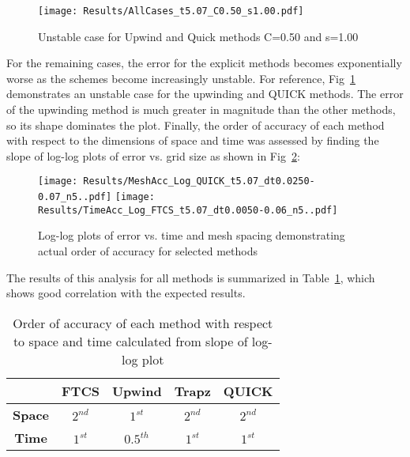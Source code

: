 \documentclass[twocolumn,10pt]{asme2ej}
\begin{document}
\begin{figure}[h]
\begin{center}
\texttt{[image: Results/AllCases\_t5.07\_C0.50\_s1.00.pdf]}
\caption{Unstable case for Upwind and Quick methods C=0.50 and s=1.00}
\label{Unstable}
\end{center}
\end{figure}

\noindent For the remaining cases, the error for the explicit methods becomes exponentially worse as the schemes become increasingly unstable.  For reference, Fig~\ref{Unstable} demonstrates an unstable case for the upwinding and QUICK methods.  The error of the upwinding method is much greater in magnitude than the other methods, so its shape dominates the plot.
Finally, the order of accuracy of each method with respect to the dimensions of space and time was assessed by finding the slope of log-log plots of error vs. grid size as shown in Fig~\ref{OrderAccuracy}:

\begin{figure}[htb]
\begin{center}
\texttt{[image: Results/MeshAcc\_Log\_QUICK\_t5.07\_dt0.0250-0.07\_n5..pdf]}
\texttt{[image: Results/TimeAcc\_Log\_FTCS\_t5.07\_dt0.0050-0.06\_n5..pdf]}
\caption{Log-log plots of error vs. time and mesh spacing demonstrating actual order of accuracy for selected methods}
\label{OrderAccuracy}
\end{center}
\end{figure}

\clearpage
The results of this analysis for all methods is summarized in Table~\ref{OrderAccuracyTable}, which shows good correlation with the expected results. 

\begin{table}[htb]
\begin{center}
\label{OrderAccuracyTable}
\begin{tabular}{|c | c c c c|}
\hline
{} & \textbf{FTCS} & \textbf{Upwind} & \textbf{Trapz} & \textbf{QUICK} \\
\hline
\textbf{Space} & $2^{nd}$ & $1^{st}$ & $2^{nd}$ & $2^{nd}$ \\
\textbf{Time} & $1^{st}$ & $0.5^{th}$ & $1^{st}$ & $1^{st}$ \\
\hline
\end{tabular}
\caption{Order of accuracy of each method with respect to space and time calculated from slope of log-log plot}
\end{center}
\end{table}
\end{document}

